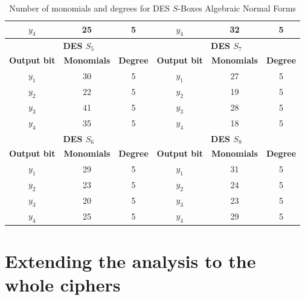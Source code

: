 \documentclass{report}
\begin{document}
\begin{table}[H]
\begin{tabular}{|c|c|c|c|c|c|}
$y_4$               & 25                 & 5               & $y_4$               & 32                 & 5               \\ \hline
\multicolumn{3}{|c|}{\textbf{DES $S_5$}}                   & \multicolumn{3}{c|}{\textbf{DES $S_7$}}                    \\ \hline
\textbf{Output bit} & \textbf{Monomials} & \textbf{Degree} & \textbf{Output bit} & \textbf{Monomials} & \textbf{Degree} \\ \hline
$y_1$               & 30                 & 5               & $y_1$               & 27                 & 5               \\ \hline
$y_2$               & 22                 & 5               & $y_2$               & 19                 & 5               \\ \hline
$y_3$               & 41                 & 5               & $y_3$               & 28                 & 5               \\ \hline
$y_4$               & 35                 & 5               & $y_4$               & 18                 & 5               \\ \hline
\multicolumn{3}{|c|}{\textbf{DES $S_6$}}                   & \multicolumn{3}{c|}{\textbf{DES $S_8$}}                    \\ \hline
\textbf{Output bit} & \textbf{Monomials} & \textbf{Degree} & \textbf{Output bit} & \textbf{Monomials} & \textbf{Degree} \\ \hline
$y_1$               & 29                 & 5               & $y_1$               & 31                 & 5               \\ \hline
$y_2$               & 23                 & 5               & $y_2$               & 24                 & 5               \\ \hline
$y_3$               & 20                 & 5               & $y_3$               & 23                 & 5               \\ \hline
$y_4$               & 25                 & 5               & $y_4$               & 29                 & 5               \\ \hline
\end{tabular}
\caption{Number of monomials and degrees for DES $S$-Boxes Algebraic Normal Forms}
\label{tab:des-anf-data}
\end{table}

\section{Extending the analysis to the whole ciphers}
\end{document}
